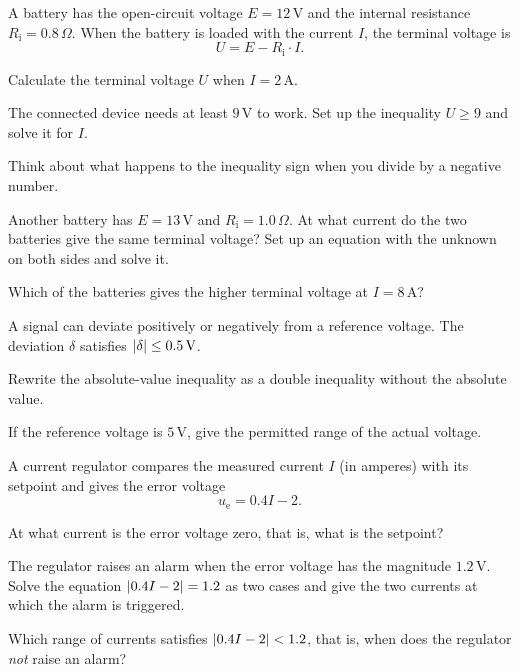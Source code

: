 A battery has the open-circuit voltage $E = 12\,\text{V}$ and the internal resistance
$R_{\text{i}} = 0.8\,\Omega$. When the battery is loaded with the current $I$, the terminal
voltage is
\[
  U = E - R_{\text{i}} \cdot I.
\]


\begin{parts}
  \item Calculate the terminal voltage $U$ when $I = 2\,\text{A}$.
  \item The connected device needs at least $9\,\text{V}$ to work. Set up the inequality
    $U \geq 9$ and solve it for $I$.
    \begin{aside}
    \note[Tip] Think about what happens to the inequality sign when you divide by a negative
    number.
    \end{aside}
  \item Another battery has $E = 13\,\text{V}$ and $R_{\text{i}} = 1.0\,\Omega$. At what current
    do the two batteries give the same terminal voltage? Set up an equation with the unknown on
    both sides and solve it.
  \item Which of the batteries gives the higher terminal voltage at $I = 8\,\text{A}$?
\end{parts}

A signal can deviate positively or negatively from a reference voltage. The deviation $\delta$
satisfies $\lvert\delta\rvert \leq 0.5\,\text{V}$.
\begin{parts}
  \item Rewrite the absolute-value inequality as a double inequality without the absolute value.
  \item If the reference voltage is $5\,\text{V}$, give the permitted range of the actual
    voltage.
\end{parts}

A current regulator compares the measured current $I$ (in amperes) with its setpoint and gives
the error voltage
\[
  u_{\text{e}} = 0.4I - 2.
\]
\begin{parts}
  \item At what current is the error voltage zero, that is, what is the setpoint?
  \item The regulator raises an alarm when the error voltage has the magnitude $1.2\,\text{V}$.
    Solve the equation $\lvert0.4I - 2\rvert = 1.2$ as two cases and give the two currents at which the
    alarm is triggered.
  \item Which range of currents satisfies $\lvert0.4I - 2\rvert < 1.2$, that is, when does the
    regulator \emph{not} raise an alarm?
\end{parts}

